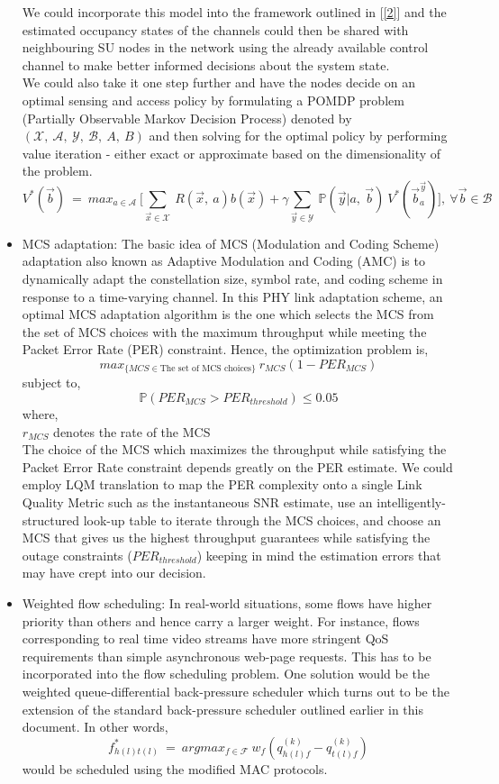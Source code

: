 \documentclass[12pt, draftcls, onecolumn]{IEEEtran}
\begin{document}
\begin{itemize}
    We could incorporate this model into the framework outlined in [\ref{2}] and the estimated occupancy states of the channels could then be shared with neighbouring SU nodes in the network using the already available control channel to make better informed decisions about the system state.
    \\We could also take it one step further and have the nodes decide on an optimal sensing and access policy by formulating a POMDP problem (Partially Observable Markov Decision Process) denoted by $(\mathcal{X},\ \mathcal{A},\ \mathcal{Y},\ \mathcal{B},\ A,\ B)$ and then solving for the optimal policy by performing value iteration - either exact or approximate based on the dimensionality of the problem.
    \begin{equation*}
        V^*(\vec{b})\ =\ max_{a \in \mathcal{A}}\ \Big[\sum_{\vec{x} \in \mathcal{X}}\ R(\vec{x},\ a)b(\vec{x}) + \gamma \sum_{\vec{y} \in \mathcal{Y}}\ \mathbb{P}(\vec{y}|a,\ \vec{b})\ V^*(\vec{b}_a^{\vec{y}})\Big],\ \forall \vec{b} \in \mathcal{B}
    \end{equation*}
    \item MCS adaptation: The basic idea of MCS (Modulation and Coding Scheme) adaptation also known as Adaptive Modulation and Coding (AMC) is to dynamically adapt the constellation size, symbol rate, and coding scheme in response to a time-varying channel. In this PHY link adaptation scheme, an optimal MCS adaptation algorithm is the one which selects the MCS from the set of MCS choices with the maximum throughput while meeting the Packet Error Rate (PER) constraint. Hence, the optimization problem is,
    \[max_{\{MCS \in \text{The set of MCS choices}\}}\ r_{MCS}(1 - PER_{MCS})\]
    subject to,
    \[\mathbb{P}(PER_{MCS} > PER_{threshold}) \leq 0.05\]
    where,
    \\$r_{MCS}$ denotes the rate of the MCS
    \\The choice of the MCS which maximizes the throughput while satisfying the Packet Error Rate constraint depends greatly on the PER estimate. We could employ LQM translation to map the PER complexity onto a single Link Quality Metric such as the instantaneous SNR estimate, use an intelligently-structured look-up table to iterate through the MCS choices, and choose an MCS that gives us the highest throughput guarantees while satisfying the outage constraints ($PER_{threshold}$) keeping in mind the estimation errors that may have crept into our decision.
    \item Weighted flow scheduling: In real-world situations, some flows have higher priority than others and hence carry a larger weight. For instance, flows corresponding to real time video streams have more stringent QoS requirements than simple asynchronous web-page requests. This has to be incorporated into the flow scheduling problem. One solution would be the weighted queue-differential back-pressure scheduler which turns out to be the extension of the standard back-pressure scheduler outlined earlier in this document. In other words, \[f_{h(l)t(l)}^*\ =\ argmax_{f \in \mathcal{F}}\ w_f(q_{h(l)f}^{(k)} - q_{t(l)f}^{(k)})\] would be scheduled using the modified MAC protocols.
\end{itemize}
\end{document}
